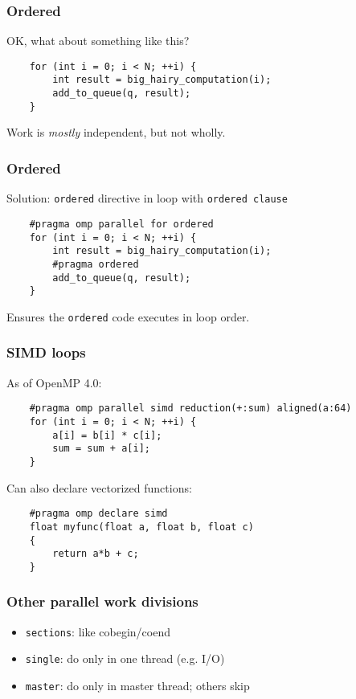 \documentclass{beamer}
\begin{document}
\begin{frame}[fragile]
  \frametitle{Ordered}

  OK, what about something like this?
  \begin{lstlisting}
    for (int i = 0; i < N; ++i) {
        int result = big_hairy_computation(i);
        add_to_queue(q, result);
    }
  \end{lstlisting}
  Work is {\em mostly} independent, but not wholly.
\end{frame}


\begin{frame}[fragile]
  \frametitle{Ordered}

  Solution: {\tt ordered} directive in loop with {\tt ordered clause}
  \begin{lstlisting}
    #pragma omp parallel for ordered
    for (int i = 0; i < N; ++i) {
        int result = big_hairy_computation(i);
        #pragma ordered
        add_to_queue(q, result);
    }
  \end{lstlisting}
  Ensures the {\tt ordered} code executes in loop order.
\end{frame}


\begin{frame}[fragile]
  \frametitle{SIMD loops}

  As of OpenMP 4.0:
\begin{lstlisting}
    #pragma omp parallel simd reduction(+:sum) aligned(a:64)
    for (int i = 0; i < N; ++i) {
        a[i] = b[i] * c[i];
        sum = sum + a[i];
    }
\end{lstlisting}
  Can also declare vectorized functions: \\
\begin{lstlisting}
    #pragma omp declare simd
    float myfunc(float a, float b, float c)
    {
        return a*b + c;
    }
\end{lstlisting}
\end{frame}


\begin{frame}
  \frametitle{Other parallel work divisions}
  
  \begin{itemize}
  \item {\tt sections}: like cobegin/coend
  \item {\tt single}: do only in one thread (e.g. I/O)
  \item {\tt master}: do only in master thread; others skip
  \end{itemize}
\end{frame}
\end{document}
